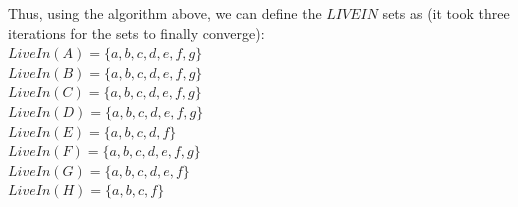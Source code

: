 \documentclass[11pt]{article}
\begin{document}
\begin{enumerate}
\begin{Answer}
		      Thus, using the algorithm above, we can define the $LIVEIN$ sets as (it took three iterations for the sets to finally converge): \\
		      $LiveIn(A) = \{a, b, c, d, e, f, g\}$ \\
		      $LiveIn(B) = \{a, b, c, d, e, f, g\}$ \\
		      $LiveIn(C) = \{a, b, c, d, e, f, g\}$ \\
		      $LiveIn(D) = \{a, b, c, d, e, f, g\}$ \\
		      $LiveIn(E) = \{a, b, c, d, f\}$ \\
		      $LiveIn(F) = \{a, b, c, d, e, f, g\}$ \\
		      $LiveIn(G) = \{a, b, c, d, e, f\}$ \\
		      $LiveIn(H) = \{a, b, c, f\}$ \\
	      \end{Answer}
\end{enumerate}
\end{document}
